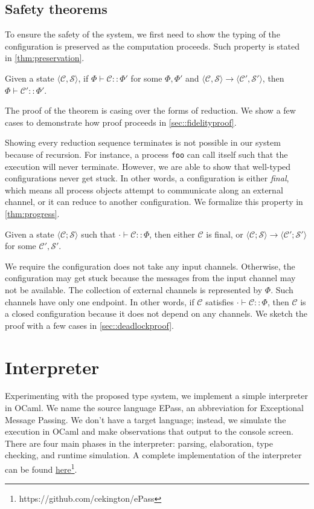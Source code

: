 \documentclass[12pt, openany]{memoir}
\newcommand*{\config}[0]{\mathcal{C}}
\newcommand*{\cancelSet}[0]{\mathcal{S}}
\begin{document}
\section{Safety theorems}
To ensure the safety of the system, we first need to show the typing of the configuration is preserved as the computation proceeds.
Such property is stated in \cref{thm:preservation}.
\begin{theorem}\label{thm:preservation}
  Given a state $\langle \config, \cancelSet \rangle$, if $\Phi \vdash \config :: \Phi'$ for some $\Phi, \Phi'$
  and $\langle \config, \cancelSet \rangle \longrightarrow \langle \config', \cancelSet' \rangle$,
  then $\Phi \vdash \config' :: \Phi'$.
\end{theorem}
The proof of the theorem is casing over the forms of reduction. 
We show a few cases to demonstrate how proof proceeds in \cref{sec::fidelityproof}.

Showing every reduction sequence terminates is not possible in our system because of recursion. 
For instance, a process \texttt{foo} can call itself such that the execution will never terminate.
However, we are able to show that well-typed configurations never get stuck.
In other words, a configuration is either \textit{final}, which means all process objects attempt to communicate along an external channel,
or it can reduce to another configuration. We formalize this property in \cref{thm:progress}.
\begin{theorem}\label{thm:progress}
  Given a state $\langle \config; \cancelSet \rangle$ such that $\cdot \vdash \config :: \Phi$, then either $\config$ is final, or 
  $\langle \config; \cancelSet \rangle \longrightarrow \langle \config'; \cancelSet' \rangle$ for some $\config', \cancelSet'$.
\end{theorem}
We require the configuration does not take any input channels. 
Otherwise, the configuration may get stuck because the messages from the input channel may not be available.
The collection of external channels is represented by $\Phi$. Such channels have only one endpoint.
In other words, if $\config$ satisfies $\cdot \vdash \config :: \Phi$, then $\config$ is a closed configuration because it does not depend on any channels.
We sketch the proof with a few cases in \cref{sec::deadlockproof}.
\chapter{Interpreter}
Experimenting with the proposed type system, we implement a simple interpreter in OCaml. 
We name the source language EPass, an abbreviation for Exceptional Message Passing. 
We don't have a target language; instead, we simulate the execution in OCaml and make observations that output to the console screen. 
There are four main phases in the interpreter: parsing, elaboration, type checking, and runtime simulation.
A complete implementation of the interpreter can be found \href{https://github.com/cekington/ePass}{here}\footnote{https://github.com/cekington/ePass}.
\end{document}
